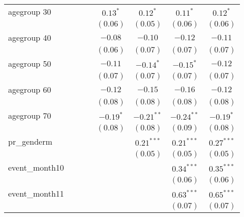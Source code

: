 \begin{table}
\begin{center}
\begin{tabular}{l c c c c c c c }
agegroup 30        &              &              &              & $0.13^{*}$   & $0.12^{*}$   & $0.11^{*}$   & $0.12^{*}$    \\
                   &              &              &              & $(0.06)$     & $(0.05)$     & $(0.06)$     & $(0.06)$      \\
agegroup 40        &              &              &              & $-0.08$      & $-0.10$      & $-0.12$      & $-0.11$       \\
                   &              &              &              & $(0.06)$     & $(0.07)$     & $(0.07)$     & $(0.07)$      \\
agegroup 50        &              &              &              & $-0.11$      & $-0.14^{*}$  & $-0.15^{*}$  & $-0.12$       \\
                   &              &              &              & $(0.07)$     & $(0.07)$     & $(0.07)$     & $(0.07)$      \\
agegroup 60        &              &              &              & $-0.12$      & $-0.15$      & $-0.16$      & $-0.12$       \\
                   &              &              &              & $(0.08)$     & $(0.08)$     & $(0.08)$     & $(0.08)$      \\
agegroup 70        &              &              &              & $-0.19^{*}$  & $-0.21^{**}$ & $-0.24^{**}$ & $-0.19^{*}$   \\
                   &              &              &              & $(0.08)$     & $(0.08)$     & $(0.09)$     & $(0.08)$      \\
pr\_genderm        &              &              &              &              & $0.21^{***}$ & $0.21^{***}$ & $0.27^{***}$  \\
                   &              &              &              &              & $(0.05)$     & $(0.05)$     & $(0.05)$      \\
event\_month10     &              &              &              &              &              & $0.34^{***}$ & $0.35^{***}$  \\
                   &              &              &              &              &              & $(0.06)$     & $(0.06)$      \\
event\_month11     &              &              &              &              &              & $0.63^{***}$ & $0.65^{***}$  \\
                   &              &              &              &              &              & $(0.07)$     & $(0.07)$      \\

\end{tabular}
\end{center}
\end{table}

